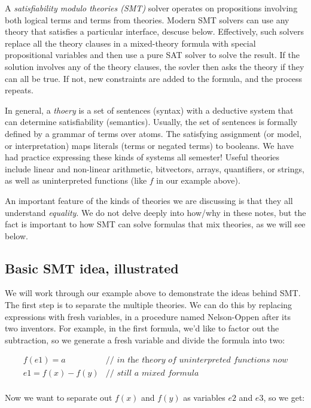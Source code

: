 \documentclass[11pt]{article}
\begin{document}
A \emph{satisfiability modulo theories (SMT)} solver operates on propositions
involving both logical terms and terms from theories. Modern SMT solvers can use
any theory that satisfies a particular interface, descuse below. Effectively,
such solvers replace all the theory clauses in a mixed-theory formula with
special propositional variables and then use a pure SAT solver to solve the
result.  If the solution involves any of the theory clauses, the sovler then
asks the theory if they can all be true.  If not, new constraints are added to
the formula, and the process repeats.  

In general, a \emph{thoery} is a set of sentences (syntax) with a deductive
system that can determine satisfiability (semantics). Usually, the set of
sentences is formally defined by a grammar of terms over atoms. The satisfying
assignment (or model, or interpretation) maps literals (terms or negated terms)
to booleans. We have had practice expressing these kinds of systems all
semester! Useful theories include linear and non-linear arithmetic, bitvectors,
arrays, quantifiers, or strings, as well as uninterpreted functions (like $f$ in
our example above).

An important feature of the kinds of theories we are discussing is that they all
understand \emph{equality}.  We do not delve deeply into how/why in these notes,
but the fact is important to how SMT can solve formulas that mix theories, as we
will see below.  


\subsection{Basic SMT idea, illustrated}

We will work through our example above to demonstrate the ideas behind SMT. The
first step is to separate the multiple theories. We can do this by replacing
expressions with fresh variables, in a procedure named Nelson-Oppen after its
two inventors. For example, in the first formula, we'd like to factor out the
subtraction, so we generate a fresh variable and divide the formula into two:

\[
\begin{array}{ll}
f(e1) = a       & \textit{// in the theory of uninterpreted functions now} \\
e1 = f(x)-f(y)  & \textit{// still a mixed formula} \\
\end{array}
\]

Now we want to separate out $f(x)$ and $f(y)$ as variables $e2$ and $e3$, so we get:
\end{document}

